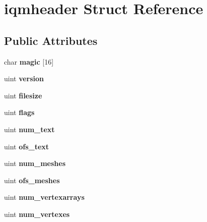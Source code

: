 \hypertarget{structiqmheader}{}\section{iqmheader Struct Reference}
\label{structiqmheader}
\subsection*{Public Attributes}
\begin{DoxyCompactItemize}
\item 
\mbox{\label{structiqmheader_a7fb160abdc2c0016e632a865b10e58d0}} 
char {\bfseries magic} \mbox{[}16\mbox{]}
\item 
\mbox{\label{structiqmheader_aff3e019e2697f1d5d092ccb07fec7f0b}} 
uint {\bfseries version}
\item 
\mbox{\label{structiqmheader_a543c34a73b63f510f6096f97660eedca}} 
uint {\bfseries filesize}
\item 
\mbox{\label{structiqmheader_a781c2aae99d9ae1d5e2d5b98a3002e0e}} 
uint {\bfseries flags}
\item 
\mbox{\label{structiqmheader_a544773be38c342fa7a72387542e863f0}} 
uint {\bfseries num\+\_\+text}
\item 
\mbox{\label{structiqmheader_a619ef09c701e7b9205a0b60b1f5ecd78}} 
uint {\bfseries ofs\+\_\+text}
\item 
\mbox{\label{structiqmheader_a0c1944bb4d17e1ccefd0ef3633b34d1f}} 
uint {\bfseries num\+\_\+meshes}
\item 
\mbox{\label{structiqmheader_aa94392b748e2c5f4f65d7ec048735cb2}} 
uint {\bfseries ofs\+\_\+meshes}
\item 
\mbox{\label{structiqmheader_a21a3812ca79f5608bd3b612aeb9b3773}} 
uint {\bfseries num\+\_\+vertexarrays}
\item 
\mbox{\label{structiqmheader_a32be14a00520b11d1e66e79131ef1937}} 
uint {\bfseries num\+\_\+vertexes}

\end{DoxyCompactItemize}
